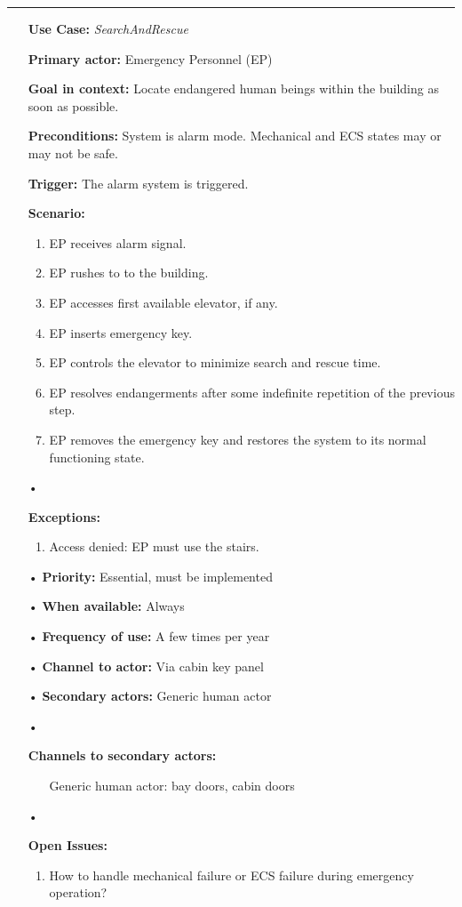 \documentclass[12pt]{article}
\begin{document}
	\par\noindent\rule{\textwidth}{0.4pt}
		\begin{itemize} %
			\item[] \textbf{Use Case:} \textit{SearchAndRescue}
			\item[] \textbf{Primary actor:} Emergency Personnel (EP)
			\item[] \textbf{Goal in context:} Locate endangered human beings within the building as soon as possible.
			\item[] \textbf{Preconditions:} System is alarm mode. Mechanical and ECS states may or may not be safe.
			\item[] \textbf{Trigger:} The alarm system is triggered.
			\item[] { \textbf{Scenario:}
		        \begin{enumerate}
		        	\item EP receives alarm signal.
		        	\item EP rushes to to the building.
		        	\item EP accesses first available elevator, if any.
		        	\item EP inserts emergency key.
		        	\item EP controls the elevator to minimize search and rescue time.
		        	\item EP resolves endangerments after some indefinite repetition of the previous step.
		        	\item EP removes the emergency key and restores the system to its normal functioning state.
		        \end{enumerate}}
			\item[•]{\textbf{Exceptions:} 
			    \begin{enumerate}
		        	\item Access denied: EP must use the stairs.
		        \end{enumerate}}
			\item[•] \textbf{Priority:} Essential, must be implemented
			\item[•] \textbf{When available:} Always
			\item[•] \textbf{Frequency of use:} A few times per year
			\item[•] \textbf{Channel to actor:} Via cabin key panel
			\item[•] \textbf{Secondary actors:} Generic human actor
			\item[•]{\textbf{Channels to secondary actors:}
			    \begin{itemize}
					\item[] Generic human actor: bay doors, cabin doors
			    \end{itemize}}
			\item[•]{\textbf{Open Issues:}
				\begin{enumerate}
					\item How to handle mechanical failure or ECS failure during emergency operation?
				\end{enumerate}} 
		\end{itemize}
\end{document}
